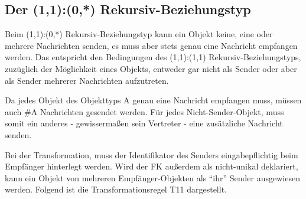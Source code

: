       \subsection{Der (1,1):(0,*) Rekursiv-Beziehungstyp}
        Beim (1,1):(0,*) Rekursiv-Beziehungstyp kann ein Objekt keine, eine oder mehrere Nachrichten senden, es muss aber stets genau eine Nachricht empfangen werden. Das entspricht den Bedingungen des (1,1):(1,1) Rekursiv-Beziehungstyps, zuz\"uglich der M\"oglichkeit eines Objekts, entweder gar nicht als Sender oder aber als Sender mehrerer Nachrichten aufzutreten.

        Da jedes Objekt des Objekttyps A genau eine Nachricht empfangen muss, m\"ussen auch \#A Nachrichten gesendet werden. F\"ur jedes Nicht-Sender-Objekt, muss somit ein anderes - gewisserma\ss en sein Vertreter - eine zus\"atzliche Nachricht senden.
        \begin{center}
        \end{center}
        Bei der Transformation, muss der Identifikator des Senders eingabepflichtig beim Empf\"anger hinterlegt werden. Wird der FK au\ss erdem als nicht-unikal deklariert, kann ein Objekt von mehreren Empf\"anger-Objekten als \enquote{ihr} Sender ausgewiesen werden. Folgend ist die Transformationsregel T11 dargestellt.
\clearpage
